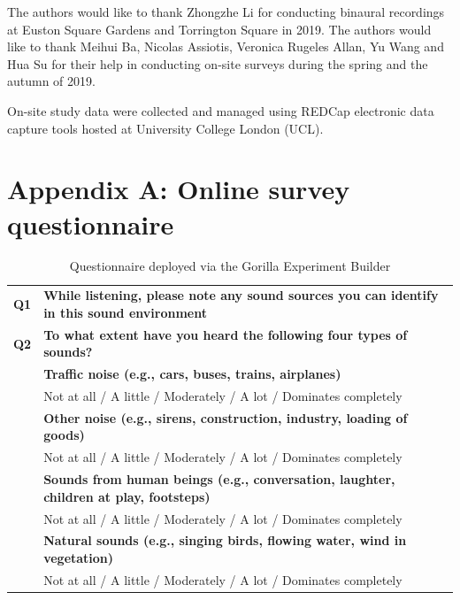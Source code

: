 \documentclass[
  authoryear,
  preprint,
  3p,
  onecolumn]{elsarticle}
\begin{document}
The authors would like to thank Zhongzhe Li for conducting binaural
recordings at Euston Square Gardens and Torrington Square in 2019. The
authors would like to thank Meihui Ba, Nicolas Assiotis, Veronica
Rugeles Allan, Yu Wang and Hua Su for their help in conducting on-site
surveys during the spring and the autumn of 2019.

On-site study data were collected and managed using REDCap electronic
data capture tools hosted at University College London (UCL).

\section*{Appendix A: Online survey
questionnaire}\label{appendix-a-online-survey-questionnaire}

\begin{longtable}[]{@{}
  >{\centering\arraybackslash}p{}
  >{\raggedright\arraybackslash}p{}@{}}
\caption{Questionnaire deployed via the Gorilla Experiment
Builder}\label{tbl-gorilla}\tabularnewline
\toprule\noalign{}
\endfirsthead
\endhead
\bottomrule\noalign{}
\endlastfoot
\textbf{Q1} & \textbf{While listening, please note any sound sources you
can identify in this sound environment} \\
\textbf{Q2} & \textbf{To what extent have you heard the following four
types of sounds?} \\
& \textbf{Traffic noise (e.g., cars, buses, trains, airplanes)} \\
& Not at all / A little / Moderately / A lot / Dominates completely \\
& \textbf{Other noise (e.g., sirens, construction, industry, loading of
goods)} \\
& Not at all / A little / Moderately / A lot / Dominates completely \\
& \textbf{Sounds from human beings (e.g., conversation, laughter,
children at play, footsteps)} \\
& Not at all / A little / Moderately / A lot / Dominates completely \\
& \textbf{Natural sounds (e.g., singing birds, flowing water, wind in
vegetation)} \\
& Not at all / A little / Moderately / A lot / Dominates completely \\
\end{longtable}
\end{document}
